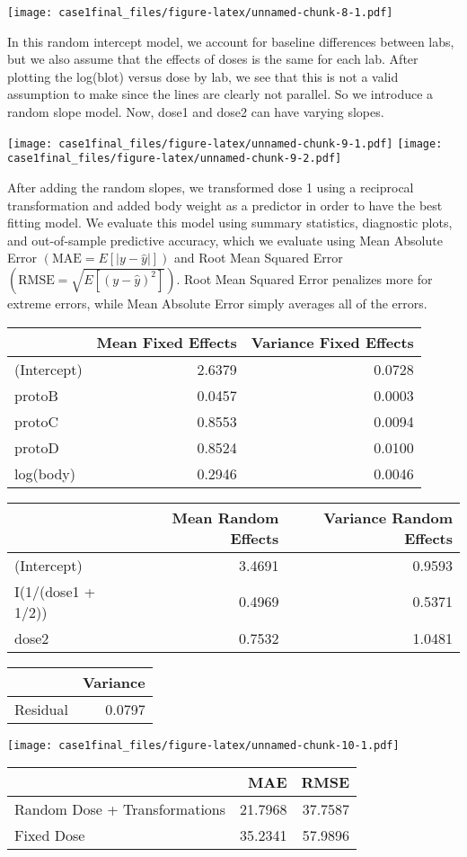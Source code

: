 \documentclass[]{article}
\begin{document}
\texttt{[image: case1final\_files/figure-latex/unnamed-chunk-8-1.pdf]}

In this random intercept model, we account for baseline differences
between labs, but we also assume that the effects of doses is the same
for each lab. After plotting the log(blot) versus dose by lab, we see
that this is not a valid assumption to make since the lines are clearly
not parallel. So we introduce a random slope model. Now, dose1 and dose2
can have varying slopes.

\texttt{[image: case1final\_files/figure-latex/unnamed-chunk-9-1.pdf]}
\texttt{[image: case1final\_files/figure-latex/unnamed-chunk-9-2.pdf]}

After adding the random slopes, we transformed dose 1 using a reciprocal
transformation and added body weight as a predictor in order to have the
best fitting model. We evaluate this model using summary statistics,
diagnostic plots, and out-of-sample predictive accuracy, which we
evaluate using Mean Absolute Error \((\text{MAE} = E[|y - \hat{y}|])\)
and Root Mean Squared Error
\((\text{RMSE} = \sqrt{E[(y - \hat{y})^2]})\). Root Mean Squared Error
penalizes more for extreme errors, while Mean Absolute Error simply
averages all of the errors.

\begin{longtable}[]{@{}lrr@{}}
\toprule
& Mean Fixed Effects & Variance Fixed Effects\tabularnewline
\midrule
\endhead
(Intercept) & 2.6379 & 0.0728\tabularnewline
protoB & 0.0457 & 0.0003\tabularnewline
protoC & 0.8553 & 0.0094\tabularnewline
protoD & 0.8524 & 0.0100\tabularnewline
log(body) & 0.2946 & 0.0046\tabularnewline
\bottomrule
\end{longtable}

\begin{longtable}[]{@{}lrr@{}}
\toprule
& Mean Random Effects & Variance Random Effects\tabularnewline
\midrule
\endhead
(Intercept) & 3.4691 & 0.9593\tabularnewline
I(1/(dose1 + 1/2)) & 0.4969 & 0.5371\tabularnewline
dose2 & 0.7532 & 1.0481\tabularnewline
\bottomrule
\end{longtable}

\begin{longtable}[]{@{}lr@{}}
\toprule
& Variance\tabularnewline
\midrule
\endhead
Residual & 0.0797\tabularnewline
\bottomrule
\end{longtable}

\texttt{[image: case1final\_files/figure-latex/unnamed-chunk-10-1.pdf]}

\begin{longtable}[]{@{}lrr@{}}
\toprule
& MAE & RMSE\tabularnewline
\midrule
\endhead
Random Dose + Transformations & 21.7968 & 37.7587\tabularnewline
Fixed Dose & 35.2341 & 57.9896\tabularnewline
\bottomrule
\end{longtable}
\end{document}

